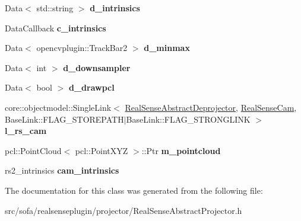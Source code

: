 \begin{DoxyCompactItemize}
\item 
\mbox{\label{classsofa_1_1rgbdtracking_1_1_real_sense_abstract_deprojector_a8208172bcb64e5ffa7e3ef36182d9fff}} 
Data$<$ std\+::string $>$ {\bfseries d\+\_\+intrinsics}
\item 
\mbox{\label{classsofa_1_1rgbdtracking_1_1_real_sense_abstract_deprojector_a1194f7c58abfef73ea623a3bd18b09c7}} 
Data\+Callback {\bfseries c\+\_\+intrinsics}
\item 
\mbox{\label{classsofa_1_1rgbdtracking_1_1_real_sense_abstract_deprojector_a8c68e247b9ec182e5b014e1d52ed5284}} 
Data$<$ opencvplugin\+::\+Track\+Bar2 $>$ {\bfseries d\+\_\+minmax}
\item 
\mbox{\label{classsofa_1_1rgbdtracking_1_1_real_sense_abstract_deprojector_aa28563fc31f5d63f1df5b32940a2e305}} 
Data$<$ int $>$ {\bfseries d\+\_\+downsampler}
\item 
\mbox{\label{classsofa_1_1rgbdtracking_1_1_real_sense_abstract_deprojector_afd99828d27af6b6c40cc17dec09fd818}} 
Data$<$ bool $>$ {\bfseries d\+\_\+drawpcl}
\item 
\mbox{\label{classsofa_1_1rgbdtracking_1_1_real_sense_abstract_deprojector_aab3f3872a892158eb75c162ceb9dc270}} 
core\+::objectmodel\+::\+Single\+Link$<$ \hyperlink{classsofa_1_1rgbdtracking_1_1_real_sense_abstract_deprojector}{Real\+Sense\+Abstract\+Deprojector}, \hyperlink{classsofa_1_1rgbdtracking_1_1_real_sense_cam}{Real\+Sense\+Cam}, Base\+Link\+::\+F\+L\+A\+G\+\_\+\+S\+T\+O\+R\+E\+P\+A\+TH$\vert$Base\+Link\+::\+F\+L\+A\+G\+\_\+\+S\+T\+R\+O\+N\+G\+L\+I\+NK $>$ {\bfseries l\+\_\+rs\+\_\+cam}
\item 
\mbox{\label{classsofa_1_1rgbdtracking_1_1_real_sense_abstract_deprojector_a3317c507cc889b1537c708abb50196da}} 
pcl\+::\+Point\+Cloud$<$ pcl\+::\+Point\+X\+YZ $>$\+::Ptr {\bfseries m\+\_\+pointcloud}
\item 
\mbox{\label{classsofa_1_1rgbdtracking_1_1_real_sense_abstract_deprojector_abb8025a1f9a471ec9370263b637271f4}} 
rs2\+\_\+intrinsics {\bfseries cam\+\_\+intrinsics}
\end{DoxyCompactItemize}


The documentation for this class was generated from the following file\+:\begin{DoxyCompactItemize}
\item 
src/sofa/realsenseplugin/projector/Real\+Sense\+Abstract\+Projector.\+h\end{DoxyCompactItemize}
